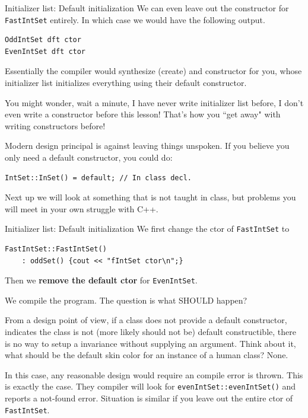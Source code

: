 \begin{frame}[fragile]{Initializer list: Default initialization}
We can even leave out the constructor for \texttt{FastIntSet} entirely. In which case we would have the following output.

\begin{verbatim}
OddIntSet dft ctor
EvenIntSet dft ctor
\end{verbatim}

Essentially the compiler would synthesize (create) and constructor for you, whose initializer list initializes everything using their default constructor.  

You might wonder, wait a minute, I have never write initializer list before, I don't even write a constructor before this lesson! That's how you ``get away" with writing constructors before!

Modern design principal is against leaving things unspoken. If you believe you only need a default constructor, you could do:

\begin{verbatim}
IntSet::InSet() = default; // In class decl.
\end{verbatim}

Next up we will look at something that is not taught in class, but problems you will meet in your own struggle with C++.
\end{frame}

\begin{frame}[fragile]{Initializer list: Default initialization}
We first change the ctor of \texttt{FastIntSet} to 
\begin{verbatim}
FastIntSet::FastIntSet() 
    : oddSet() {cout << "fIntSet ctor\n";}
\end{verbatim}

Then we \textbf{remove the default ctor} for \texttt{EvenIntSet}.

We compile the program. The question is what SHOULD happen?

\pause
\vspace{0.1in}
From a design point of view, if a class does not provide a default constructor, indicates the class is not (more likely should not be) default constructible, there is no way to setup a invariance without supplying an argument. Think about it, what should be the default skin color for an instance of a human class? None.

In this case, any reasonable design would require an compile error is thrown. This is exactly the case. They compiler will look for \texttt{evenIntSet::evenIntSet()} and reports a not-found error. \alert{Situation is similar if you leave out the entire ctor of \texttt{FastIntSet}.}
\end{frame}

